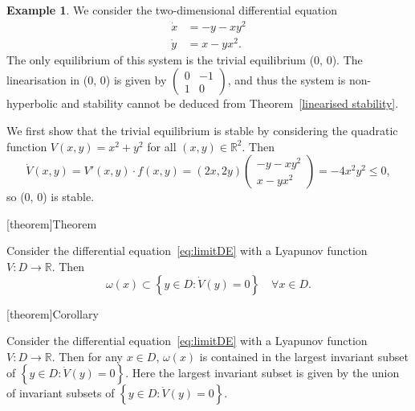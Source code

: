 \documentclass[12pt]{report}
\theoremstyle{definition}
\begin{document}
\newtheorem{application of Lyapunov's direct method for stability}[theorem]{Example}
\begin{application of Lyapunov's direct method for stability}
    We consider the two-dimensional differential equation
    \begin{align*}
        \dot{x} & = -y-xy^{2} \\
        \dot{y} & = x-yx^{2}.
    \end{align*} 
    The only equilibrium of this system is the trivial equilibrium (0, 0).
    The linearisation in (0, 0) is given by $\begin{pmatrix}
        0 & -1\\
        1 & 0
    \end{pmatrix} $, and thus the system is non-hyperbolic and stability cannot
    be deduced from Theorem~\ref{linearised stability}.

    We first show that the trivial equilibrium is stable by considering the
    quadratic function $V(x,y)=x^{2}+y^2$ for all $(x,y)\in\mathbb{R}^{2}$. Then
    \[
        \dot{V}(x,y)=V'(x,y)\cdot f(x,y)=(2x,2y)\begin{pmatrix}
                -y-xy^{2} \\
                x-yx^{2}
        \end{pmatrix} = -4x^{2}y^{2}\le 0,
    \]
    so (0, 0) is stable. 
\end{application of Lyapunov's direct method for stability}

[theorem]{Theorem}
\begin{La salle's invariance principle}
    Consider the differential equation~\eqref{eq:limitDE} with a Lyapunov
    function $V:D\rightarrow\mathbb{R}$. Then
    \[
        \omega(x)\subset\left\{y\in D:\dot{V}(y)=0\right\}
        \quad\forall x\in D.
    \]
\end{La salle's invariance principle}

[theorem]{Corollary}
\begin{reformulation of La salle's invariance principle}
    Consider the differential equation~\eqref{eq:limitDE} with a Lyapunov
    function $V:D\rightarrow\mathbb{R}$. Then for any $x\in D$, 
    $\omega(x)$ is contained in the largest invariant subset of 
    $\left\{y\in D:\dot{V}(y)=0\right\}$. Here the largest invariant subset is
    given by the union of invariant subsets of $\left\{y\in
    D:\dot{V}(y)=0\right\}$.
\end{reformulation of La salle's invariance principle}
\end{document}

